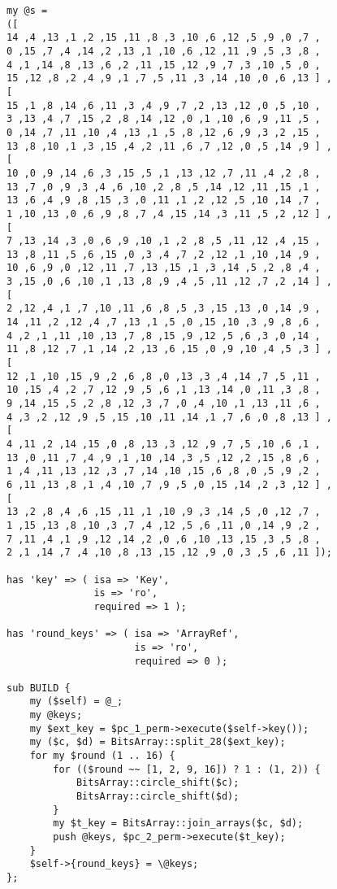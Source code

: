 \documentclass[10pt,a4paper]{article}
\begin{document}
\begin{lstlisting}
my @s =
([
14 ,4 ,13 ,1 ,2 ,15 ,11 ,8 ,3 ,10 ,6 ,12 ,5 ,9 ,0 ,7 ,
0 ,15 ,7 ,4 ,14 ,2 ,13 ,1 ,10 ,6 ,12 ,11 ,9 ,5 ,3 ,8 ,
4 ,1 ,14 ,8 ,13 ,6 ,2 ,11 ,15 ,12 ,9 ,7 ,3 ,10 ,5 ,0 ,
15 ,12 ,8 ,2 ,4 ,9 ,1 ,7 ,5 ,11 ,3 ,14 ,10 ,0 ,6 ,13 ] ,
[
15 ,1 ,8 ,14 ,6 ,11 ,3 ,4 ,9 ,7 ,2 ,13 ,12 ,0 ,5 ,10 ,
3 ,13 ,4 ,7 ,15 ,2 ,8 ,14 ,12 ,0 ,1 ,10 ,6 ,9 ,11 ,5 ,
0 ,14 ,7 ,11 ,10 ,4 ,13 ,1 ,5 ,8 ,12 ,6 ,9 ,3 ,2 ,15 ,
13 ,8 ,10 ,1 ,3 ,15 ,4 ,2 ,11 ,6 ,7 ,12 ,0 ,5 ,14 ,9 ] ,
[
10 ,0 ,9 ,14 ,6 ,3 ,15 ,5 ,1 ,13 ,12 ,7 ,11 ,4 ,2 ,8 ,
13 ,7 ,0 ,9 ,3 ,4 ,6 ,10 ,2 ,8 ,5 ,14 ,12 ,11 ,15 ,1 ,
13 ,6 ,4 ,9 ,8 ,15 ,3 ,0 ,11 ,1 ,2 ,12 ,5 ,10 ,14 ,7 ,
1 ,10 ,13 ,0 ,6 ,9 ,8 ,7 ,4 ,15 ,14 ,3 ,11 ,5 ,2 ,12 ] ,
[
7 ,13 ,14 ,3 ,0 ,6 ,9 ,10 ,1 ,2 ,8 ,5 ,11 ,12 ,4 ,15 ,
13 ,8 ,11 ,5 ,6 ,15 ,0 ,3 ,4 ,7 ,2 ,12 ,1 ,10 ,14 ,9 ,
10 ,6 ,9 ,0 ,12 ,11 ,7 ,13 ,15 ,1 ,3 ,14 ,5 ,2 ,8 ,4 ,
3 ,15 ,0 ,6 ,10 ,1 ,13 ,8 ,9 ,4 ,5 ,11 ,12 ,7 ,2 ,14 ] ,
[
2 ,12 ,4 ,1 ,7 ,10 ,11 ,6 ,8 ,5 ,3 ,15 ,13 ,0 ,14 ,9 ,
14 ,11 ,2 ,12 ,4 ,7 ,13 ,1 ,5 ,0 ,15 ,10 ,3 ,9 ,8 ,6 ,
4 ,2 ,1 ,11 ,10 ,13 ,7 ,8 ,15 ,9 ,12 ,5 ,6 ,3 ,0 ,14 ,
11 ,8 ,12 ,7 ,1 ,14 ,2 ,13 ,6 ,15 ,0 ,9 ,10 ,4 ,5 ,3 ] ,
[
12 ,1 ,10 ,15 ,9 ,2 ,6 ,8 ,0 ,13 ,3 ,4 ,14 ,7 ,5 ,11 ,
10 ,15 ,4 ,2 ,7 ,12 ,9 ,5 ,6 ,1 ,13 ,14 ,0 ,11 ,3 ,8 ,
9 ,14 ,15 ,5 ,2 ,8 ,12 ,3 ,7 ,0 ,4 ,10 ,1 ,13 ,11 ,6 ,
4 ,3 ,2 ,12 ,9 ,5 ,15 ,10 ,11 ,14 ,1 ,7 ,6 ,0 ,8 ,13 ] ,
[
4 ,11 ,2 ,14 ,15 ,0 ,8 ,13 ,3 ,12 ,9 ,7 ,5 ,10 ,6 ,1 ,
13 ,0 ,11 ,7 ,4 ,9 ,1 ,10 ,14 ,3 ,5 ,12 ,2 ,15 ,8 ,6 ,
1 ,4 ,11 ,13 ,12 ,3 ,7 ,14 ,10 ,15 ,6 ,8 ,0 ,5 ,9 ,2 ,
6 ,11 ,13 ,8 ,1 ,4 ,10 ,7 ,9 ,5 ,0 ,15 ,14 ,2 ,3 ,12 ] ,
[
13 ,2 ,8 ,4 ,6 ,15 ,11 ,1 ,10 ,9 ,3 ,14 ,5 ,0 ,12 ,7 ,
1 ,15 ,13 ,8 ,10 ,3 ,7 ,4 ,12 ,5 ,6 ,11 ,0 ,14 ,9 ,2 ,
7 ,11 ,4 ,1 ,9 ,12 ,14 ,2 ,0 ,6 ,10 ,13 ,15 ,3 ,5 ,8 ,
2 ,1 ,14 ,7 ,4 ,10 ,8 ,13 ,15 ,12 ,9 ,0 ,3 ,5 ,6 ,11 ]);

has 'key' => ( isa => 'Key',
               is => 'ro',
               required => 1 );

has 'round_keys' => ( isa => 'ArrayRef',
                      is => 'ro',
                      required => 0 );

sub BUILD {
    my ($self) = @_;
    my @keys;
    my $ext_key = $pc_1_perm->execute($self->key());
    my ($c, $d) = BitsArray::split_28($ext_key);
    for my $round (1 .. 16) {
        for (($round ~~ [1, 2, 9, 16]) ? 1 : (1, 2)) {
            BitsArray::circle_shift($c);
            BitsArray::circle_shift($d);
        }
        my $t_key = BitsArray::join_arrays($c, $d);
        push @keys, $pc_2_perm->execute($t_key);
    }
    $self->{round_keys} = \@keys;
};


\end{lstlisting}
\end{document}
